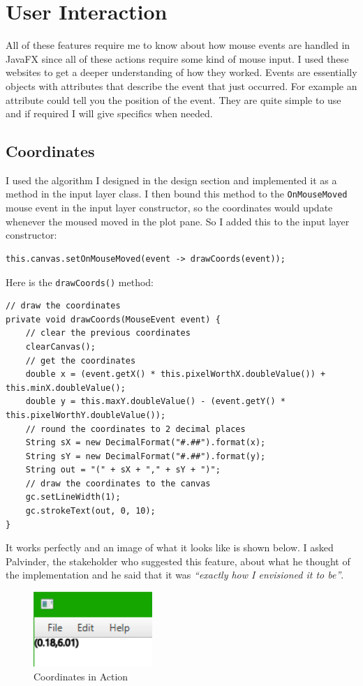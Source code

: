 \documentclass[../../../../main.tex]{subfiles}
\begin{document}
\section{User Interaction}
All of these features require me to know about how mouse events are handled in JavaFX since all of these actions require some kind of mouse input. I used these websites\cite{eventsJava} to get a deeper understanding of how they worked. Events are essentially objects with attributes that describe the event that just occurred. For example an attribute could tell you the position of the event. They are quite simple to use and if required I will give specifics when needed.

\subsection{Coordinates}
I used the algorithm I designed in the design section and implemented it as a method in the input layer class. I then bound this method to the \texttt{OnMouseMoved} mouse event in the input layer constructor, so the coordinates would update whenever the moused moved in the plot pane. So I added this to the input layer constructor:
\begin{verbatim}
this.canvas.setOnMouseMoved(event -> drawCoords(event));
\end{verbatim}
Here is the \texttt{drawCoords()} method:
\begin{verbatim}
// draw the coordinates
private void drawCoords(MouseEvent event) {
	// clear the previous coordinates
	clearCanvas();
	// get the coordinates
	double x = (event.getX() * this.pixelWorthX.doubleValue()) + this.minX.doubleValue();
	double y = this.maxY.doubleValue() - (event.getY() * this.pixelWorthY.doubleValue());
	// round the coordinates to 2 decimal places
	String sX = new DecimalFormat("#.##").format(x);
	String sY = new DecimalFormat("#.##").format(y);
	String out = "(" + sX + "," + sY + ")";
	// draw the coordinates to the canvas
	gc.setLineWidth(1);
	gc.strokeText(out, 0, 10);
}
\end{verbatim}
It works perfectly and an image of what it looks like is shown below. I asked Palvinder, the stakeholder who suggested this feature, about what he thought of the implementation and he said that it was \textit{``exactly how I envisioned it to be''}.
\begin{figure}[H]
	\centering
	\includegraphics[width=0.4\textwidth]{images/coords}
	\caption{Coordinates in Action}
\end{figure}
\newpage
\end{document}
